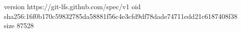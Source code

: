 version https://git-lfs.github.com/spec/v1
oid sha256:16f0b170c59832785da58881f56c4e3cfd9df78dade74711edd21c6187408f38
size 87528

